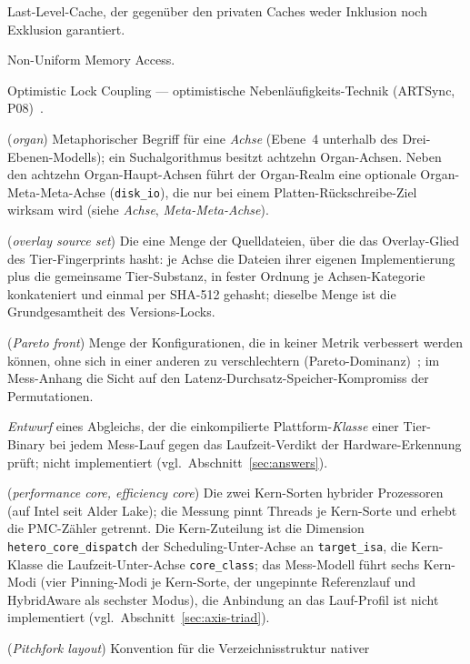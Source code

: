 \begin{description}
  Last-Level-Cache, der gegenüber den privaten Caches weder Inklusion noch Exklusion garantiert.
  \item[NUMA] Non-Uniform Memory Access.
  \item[OLC] Optimistic Lock Coupling --- optimistische Nebenläufigkeits-Technik (ARTSync,
  P08)~\cite{leis2016olc}.
  \item[Organ] (\emph{organ}) Metaphorischer Begriff für eine \emph{Achse} (Ebene~4 unterhalb des
  Drei-Ebenen-Modells); ein Suchalgorithmus besitzt achtzehn Organ-Achsen. Neben den achtzehn
  Organ-Haupt-Achsen führt der Organ-Realm eine optionale Organ-Meta-Meta-Achse
  (\texttt{disk\_io}), die nur bei einem Platten-Rückschreibe-Ziel wirksam wird (siehe
  \emph{Achse}, \emph{Meta-Meta-Achse}).
  \item[Overlay-Quellmenge] (\emph{overlay source set}) Die eine Menge der Quelldateien, über die
  das Overlay-Glied des Tier-Fingerprints hasht: je Achse die Dateien ihrer eigenen Implementierung
  plus die gemeinsame Tier-Substanz, in fester Ordnung je Achsen-Kategorie konkateniert und einmal
  per SHA-512 gehasht; dieselbe Menge ist die Grundgesamtheit des Versions-Locks.
  \item[Pareto-Front] (\emph{Pareto front}) Menge der Konfigurationen, die in keiner Metrik
  verbessert werden können, ohne sich in einer anderen zu verschlechtern
  (Pareto-Dominanz)~\cite{emmerich2018multiobjective}; im Mess-Anhang die Sicht auf den
  Latenz-Durchsatz-Speicher-Kompromiss der Permutationen.
  \item[Passungs-Stempel] \emph{Entwurf} eines Abgleichs, der die einkompilierte
  Plattform-\emph{Klasse} einer Tier-Binary bei jedem Mess-Lauf gegen das Laufzeit-Verdikt der
  Hardware-Erkennung prüft; nicht implementiert (vgl.\ Abschnitt~\ref{sec:answers}).
  \item[P-Core, E-Core] (\emph{performance core, efficiency core}) Die zwei Kern-Sorten hybrider
  Prozessoren (auf Intel seit Alder Lake); die Messung pinnt Threads je Kern-Sorte und erhebt die
  PMC-Zähler getrennt. Die Kern-Zuteilung ist die Dimension \texttt{hetero\_core\_dispatch} der
  Scheduling-Unter-Achse an \texttt{target\_isa}, die Kern-Klasse die Laufzeit-Unter-Achse
  \texttt{core\_class}; das Mess-Modell führt sechs Kern-Modi (vier Pinning-Modi je Kern-Sorte, der
  ungepinnte Referenzlauf und HybridAware als sechster Modus), die Anbindung an das Lauf-Profil ist
  nicht implementiert (vgl.\ Abschnitt~\ref{sec:axis-triad}).
  \item[Pitchfork-Layout] (\emph{Pitchfork layout}) Konvention für die Verzeichnisstruktur nativer

\end{description}
